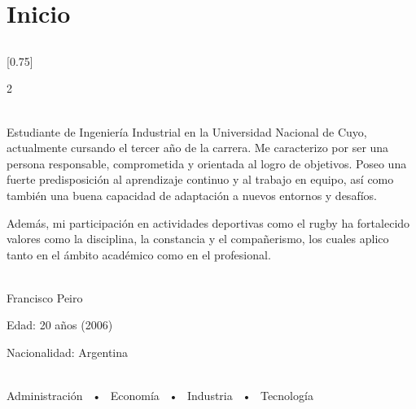 \documentclass[lighthipster]{simplehipstercv}
\begin{document}
\thispagestyle{empty}

\section*{Inicio}


\subsection*{}
\vspace{4em}

\setlength{\columnsep}{1.5cm}
[0.75]
\begin{paracol}{2}

\paracolbackgroundoptions

\footnotesize
{\setasidefontcolour
\flushright
\begin{center}
\end{center}

\\[0.5em]

Estudiante de Ingeniería Industrial en la Universidad Nacional de Cuyo, actualmente cursando el tercer año de la carrera. Me caracterizo por ser una persona responsable, comprometida y orientada al logro de objetivos. Poseo una fuerte predisposición al aprendizaje continuo y al trabajo en equipo, así como también una buena capacidad de adaptación a nuevos entornos y desafíos. 

Además, mi participación en actividades deportivas como el rugby ha fortalecido valores como la disciplina, la constancia y el compañerismo, los cuales aplico tanto en el ámbito académico como en el profesional.

\bigskip

 \\[0.5em]
Francisco Peiro

Edad: 20 años (2006)

Nacionalidad: Argentina

\bigskip

 \\[0.5em]

Administración ~•~ Economía ~•~ Industria ~•~ Tecnología

\bigskip

\\[0.5em]

}
\end{paracol}
\end{document}
